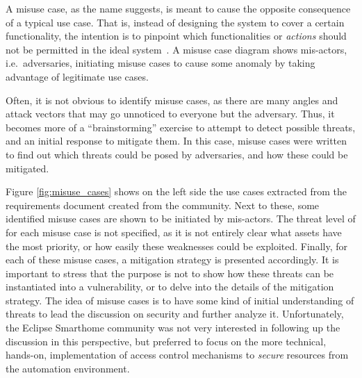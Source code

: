 \documentclass[12pt]{article}
\begin{document}
A misuse case, as the name suggests, is meant to cause the opposite consequence of a typical use case. That is, instead of designing the system to cover a certain functionality, the intention is to pinpoint which functionalities or \emph{actions} should not be permitted in the ideal system~\cite{misuse}. A misuse case diagram shows mis-actors, i.e.\ adversaries, initiating misuse cases to cause some anomaly by taking advantage of legitimate use cases.

Often, it is not obvious to identify misuse cases, as there are many angles and attack vectors that may go unnoticed to everyone but the adversary. Thus, it becomes more of a ``brainstorming'' exercise to attempt to detect possible threats, and an initial response to mitigate them. In this case, misuse cases were written to find out which threats could be posed by adversaries, and how these could be mitigated.

Figure \ref{fig:misuse_cases} shows on the left side the use cases extracted from the requirements document created from the community. Next to these, some identified misuse cases are shown to be initiated by mis-actors. The threat level of for each misuse case is not specified, as it is not entirely clear what assets have the most priority, or how easily these weaknesses could be exploited. Finally, for each of these misuse cases, a mitigation strategy is presented accordingly. It is important to stress that the purpose is not to show how these threats can be instantiated into a vulnerability, or to delve into the details of the mitigation strategy. The idea of misuse cases is to have some kind of initial understanding of threats to lead the discussion on security and further analyze it. Unfortunately, the Eclipse Smarthome community was not very interested in following up the discussion in this perspective, but preferred to focus on the more technical, hands-on, implementation of access control mechanisms to \emph{secure} resources from the automation environment.
\end{document}
